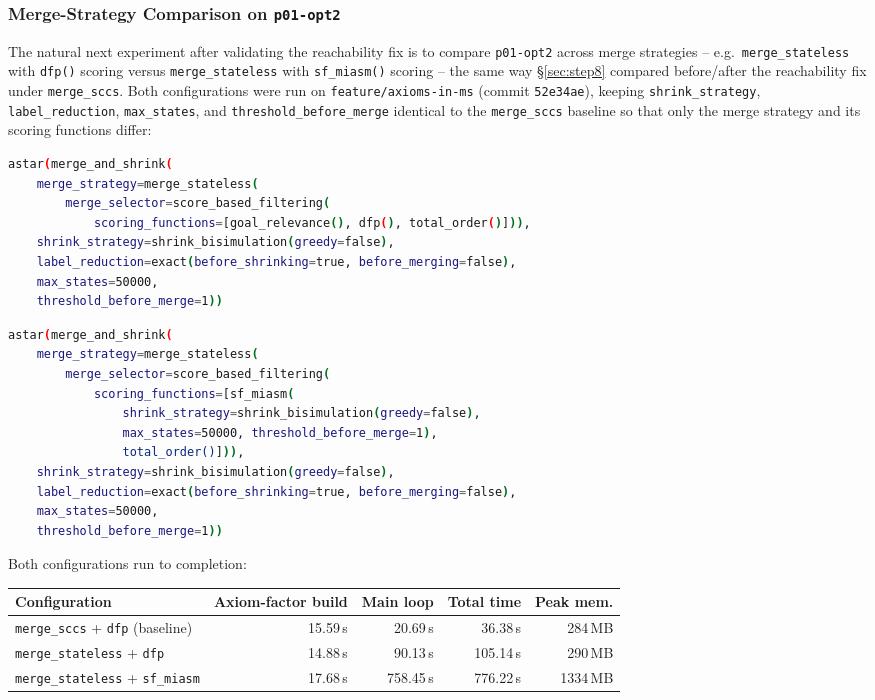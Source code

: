 \documentclass[11pt,a4paper]{article}
\begin{document}
\subsubsection{Merge-Strategy Comparison on \texttt{p01-opt2}}

The natural next experiment after validating the reachability fix is to
compare \texttt{p01-opt2} across merge strategies -- e.g.\
\texttt{merge\_stateless} with \texttt{dfp()} scoring versus
\texttt{merge\_stateless} with \texttt{sf\_miasm()} scoring -- the same way
\S\ref{sec:step8} compared before/after the reachability fix under
\texttt{merge\_sccs}. Both configurations were run on
\texttt{feature/axioms-in-ms} (commit \texttt{52e34ae}), keeping
\texttt{shrink\_strategy}, \texttt{label\_reduction}, \texttt{max\_states},
and \texttt{threshold\_before\_merge} identical to the \texttt{merge\_sccs}
baseline so that only the merge strategy and its scoring functions differ:

\begin{lstlisting}[language=bash, caption={stateless+DFP configuration on p01-opt2}]
astar(merge_and_shrink(
    merge_strategy=merge_stateless(
        merge_selector=score_based_filtering(
            scoring_functions=[goal_relevance(), dfp(), total_order()])),
    shrink_strategy=shrink_bisimulation(greedy=false),
    label_reduction=exact(before_shrinking=true, before_merging=false),
    max_states=50000,
    threshold_before_merge=1))
\end{lstlisting}

\begin{lstlisting}[language=bash, caption={stateless+MIASM configuration on p01-opt2}]
astar(merge_and_shrink(
    merge_strategy=merge_stateless(
        merge_selector=score_based_filtering(
            scoring_functions=[sf_miasm(
                shrink_strategy=shrink_bisimulation(greedy=false),
                max_states=50000, threshold_before_merge=1),
                total_order()])),
    shrink_strategy=shrink_bisimulation(greedy=false),
    label_reduction=exact(before_shrinking=true, before_merging=false),
    max_states=50000,
    threshold_before_merge=1))
\end{lstlisting}

Both configurations run to completion:

\begin{center}
\begin{tabular}{lrrrr}
\toprule
\textbf{Configuration} & \textbf{Axiom-factor build} & \textbf{Main loop} & \textbf{Total time} & \textbf{Peak mem.} \\
\midrule
\texttt{merge\_sccs} + \texttt{dfp} (baseline) & 15.59\,s & 20.69\,s & 36.38\,s & 284\,MB \\
\texttt{merge\_stateless} + \texttt{dfp} & 14.88\,s & 90.13\,s & 105.14\,s & 290\,MB \\
\texttt{merge\_stateless} + \texttt{sf\_miasm} & 17.68\,s & 758.45\,s & 776.22\,s & 1334\,MB \\
\bottomrule
\end{tabular}
\end{center}
\end{document}
